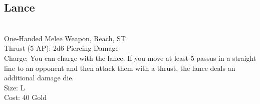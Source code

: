 \subsection{Lance}\label{weapon:lance}\\
One-Handed Melee Weapon,  Reach, ST\\
Thrust (5 AP): 2d6 Piercing Damage\\
Charge: You can charge with the lance.
If you move at least 5 passus in a straight line to an opponent and then attack them with a thrust, the lance deals an additional damage die.\\
Size: L\\
Cost: 40 Gold\\